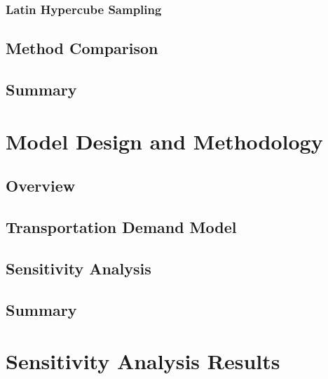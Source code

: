 \documentclass[fancy, masters,twoside]{byuthesis}
\begin{document}
\hypertarget{latin-hypercube-sampling}{%
\subsection{Latin Hypercube Sampling}\label{latin-hypercube-sampling}}

\hypertarget{method-comparison}{%
\section{Method Comparison}\label{method-comparison}}

\hypertarget{summary-1}{%
\section{Summary}\label{summary-1}}

\hypertarget{model-design-and-methodology}{%
\chapter{Model Design and Methodology}\label{model-design-and-methodology}}

\hypertarget{overview-2}{%
\section{Overview}\label{overview-2}}

\hypertarget{transportation-demand-model}{%
\section{Transportation Demand Model}\label{transportation-demand-model}}

\hypertarget{sensitivity-analysis}{%
\section{Sensitivity Analysis}\label{sensitivity-analysis}}

\hypertarget{summary-2}{%
\section{Summary}\label{summary-2}}

\hypertarget{sensitivity-analysis-results}{%
\chapter{Sensitivity Analysis Results}\label{sensitivity-analysis-results}}
\end{document}
